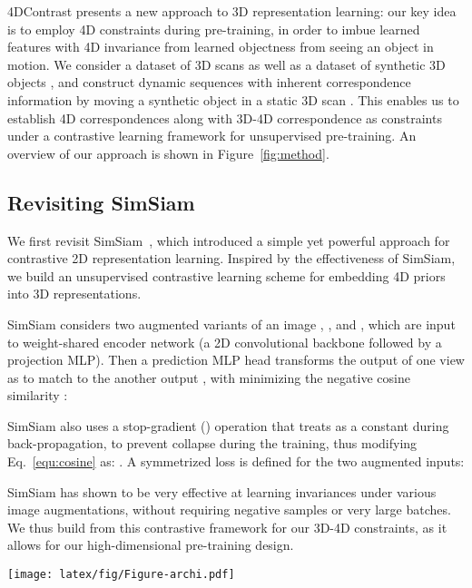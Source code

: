 \documentclass[runningheads]{llncs}
\newcommand{\OURS}{4DContrast}
\begin{document}
\OURS{} presents a new approach to 3D representation learning: our key idea is to employ 4D constraints during pre-training, in order to imbue learned features with 4D invariance from learned objectness from seeing an object in motion.
We consider a dataset of 3D scans  as well as a dataset of synthetic 3D objects , and construct dynamic sequences with inherent correspondence information by moving a synthetic object  in a static 3D scan .
This enables us to establish 4D correspondences along with 3D-4D correspondence as constraints under a contrastive learning framework for unsupervised pre-training.
An overview of our approach is shown in Figure~\ref{fig:method}.

\subsection{Revisiting SimSiam}
\label{subsec:simsiam}
We first revisit SimSiam~\cite{chen2021exploring}, which introduced a simple yet powerful approach for contrastive 2D representation learning. Inspired by the effectiveness of SimSiam, we build an unsupervised contrastive learning scheme for embedding 4D priors into 3D representations.

SimSiam considers two augmented variants of an image , , and , which are input to weight-shared encoder network  (a 2D convolutional backbone followed by a projection MLP). Then a prediction MLP head  transforms the output of one view as  to match to the another output , with minimizing the negative cosine similarity \cite{grill2020bootstrap}:

SimSiam also uses a stop-gradient () operation that treats  as a constant during back-propagation,
to prevent collapse during the training, thus modifying Eq.~\ref{equ:cosine} as: . A symmetrized loss is defined for the two augmented inputs:


SimSiam has shown to be very effective at learning invariances under various image augmentations, without requiring negative samples or very large batches.
We thus build from this contrastive framework for our 3D-4D constraints, as it allows for our high-dimensional pre-training design.

\begin{figure*}[t]
  \centering
  \vspace{-2mm}
   \texttt{[image: latex/fig/Figure-archi.pdf]}
   \vspace{-0.2cm}
   \caption{4DContrast pre-training. 
   We visualize 3D-3D, 3D-4D, and 4D-4D losses across frame and spatio-temporal correspondence.
   Note that losses are established across all pairs of frames for   and across all frames for ; for visualization we only show those associated with frames  and , and only for  for .
   Each loss only propagates back according to the gradient arrows due to stop-gradient operations for stable training.
   }
   \vspace{-0.5cm}
   \label{fig:archi}
\end{figure*}
\end{document}
